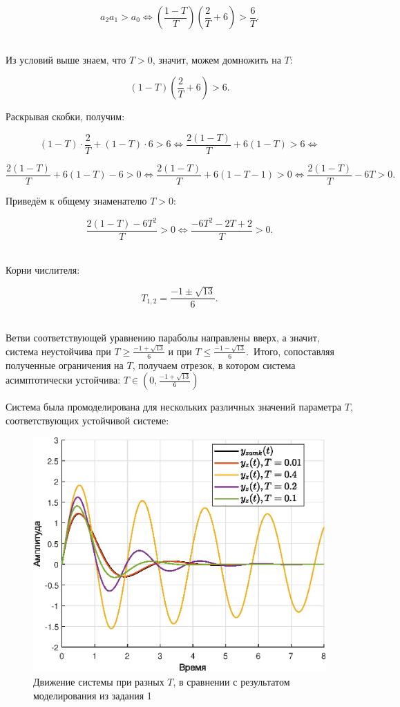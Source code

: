 \documentclass[a4paper]{article}
\begin{document}
$$a_2 a_1 > a_0 \Leftrightarrow
\left(\frac{1 - T}{T}\right) \left(\frac{2}{T} + 6\right) > \frac{6}{T}.
$$\ 

Из условий выше знаем, что $T > 0$, значит, можем домножить на $T$:

\[
(1 - T)\left(\frac{2}{T} + 6\right) > 6.
\]

Раскрывая скобки, получим:

\[
(1 - T)\cdot\frac{2}{T} + (1 - T)\cdot6 > 6\Leftrightarrow
\frac{2(1 - T)}{T} + 6(1 - T) > 6\Leftrightarrow
\]

\[
\frac{2(1 - T)}{T} + 6(1 - T) - 6 > 0\Leftrightarrow
\frac{2(1 - T)}{T} + 6(1 - T - 1) > 0\Leftrightarrow
\frac{2(1 - T)}{T} - 6T > 0.
\]

Приведём к общему знаменателю \(T > 0\):

\[
\frac{2(1 - T) - 6T^2}{T} > 0\Leftrightarrow
\frac{-6T^2 - 2T + 2}{T} > 0.
\]\

Корни числителя:

\[
T_{1, 2} = \frac{-1 \pm \sqrt{13}}{6}.
\]\ 

Ветви соответствующей уравнению параболы направлены вверх, а значит, система неустойчива при $T \ge \frac{-1 + \sqrt{13}}{6}$ и при $T\le \frac{-1 - \sqrt{13}}{6}$.\ Итого, сопоставляя полученные ограничения на $T$, получаем отрезок, в котором система асимптотически устойчива: $T \in \left(0, \frac{-1 + \sqrt{13}}{6}\right)$

Система была промоделирована для нескольких различных значений параметра $T$, соответствующих устойчивой системе:

\begin{figure}[H]
    \centering
    \includegraphics[width=0.65\linewidth]{ex2/all.eps}
    \caption{Движение системы при разных $T$, в сравнении с результатом моделирования из задания 1}
\end{figure}\
\end{document}
